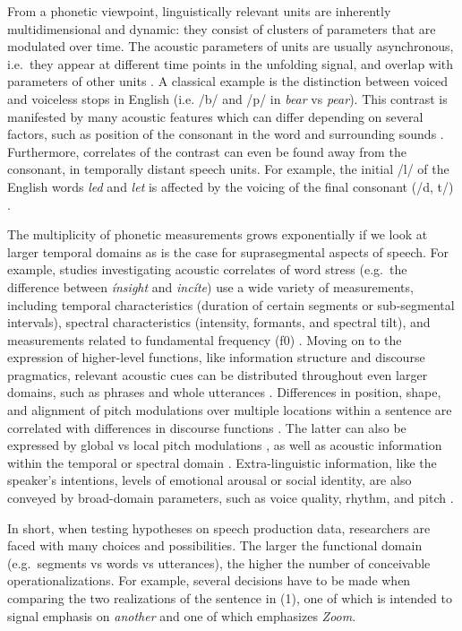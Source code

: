 \documentclass[Review,times,sageh]{sagej}
\begin{document}
From a phonetic viewpoint, linguistically relevant units are inherently
multidimensional and dynamic: they consist of clusters of parameters
that are modulated over time. The acoustic parameters of units are
usually asynchronous, i.e.~they appear at different time points in the
unfolding signal, and overlap with parameters of other units
\citep[e.g.][]{jongman2000acoustic, lisker1986voicing, summerfield1981articulatory, winter2014spoken}.
A classical example is the distinction between voiced and voiceless
stops in English (i.e. /b/ and /p/ in \emph{bear} vs \emph{pear}). This
contrast is manifested by many acoustic features which can differ
depending on several factors, such as position of the consonant in the
word and surrounding sounds \citep{lisker1977rapid}. Furthermore,
correlates of the contrast can even be found away from the consonant, in
temporally distant speech units. For example, the initial /l/ of the
English words \emph{led} and \emph{let} is affected by the voicing of
the final consonant (/d, t/) \citep{hawkins2004influence}.

The multiplicity of phonetic measurements grows exponentially if we look
at larger temporal domains as is the case for suprasegmental aspects of
speech. For example, studies investigating acoustic correlates of word
stress (e.g.~the difference between \emph{ínsight} and \emph{incíte})
use a wide variety of measurements, including temporal characteristics
(duration of certain segments or sub-segmental intervals), spectral
characteristics (intensity, formants, and spectral tilt), and
measurements related to fundamental frequency (f0)
\citep[e.g.,][]{gordon2017acoustic}. Moving on to the expression of
higher-level functions, like information structure and discourse
pragmatics, relevant acoustic cues can be distributed throughout even
larger domains, such as phrases and whole utterances
\citep[e.g.,][]{ladd2008intonational}. Differences in position, shape,
and alignment of pitch modulations over multiple locations within a
sentence are correlated with differences in discourse functions
\citep[e.g.,][]{niebuhr2011}. The latter can also be expressed by global
vs local pitch modulations \citep{heuven2002}, as well as acoustic
information within the temporal or spectral domain
\citep[e.g.,][]{van2005speech}. Extra-linguistic information, like the
speaker's intentions, levels of emotional arousal or social identity,
are also conveyed by broad-domain parameters, such as voice quality,
rhythm, and pitch \citep{foulkes2006, ogden2004, white2009}.

In short, when testing hypotheses on speech production data, researchers
are faced with many choices and possibilities. The larger the functional
domain (e.g.~segments vs words vs utterances), the higher the number of
conceivable operationalizations. For example, several decisions have to
be made when comparing the two realizations of the sentence in (1), one
of which is intended to signal emphasis on \emph{another} and one of
which emphasizes \emph{Zoom}.
\end{document}
